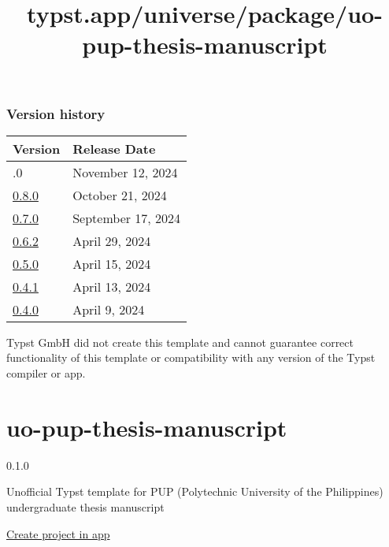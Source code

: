 \subsubsection{Version history}\label{version-history}

\begin{longtable}[]{@{}ll@{}}
\toprule\noalign{}
Version & Release Date \\
\midrule\noalign{}
\endhead
\bottomrule\noalign{}
\endlastfoot
0.9.0 & November 12, 2024 \\
\href{https://typst.app/universe/package/scholarly-tauthesis/0.8.0/}{0.8.0}
& October 21, 2024 \\
\href{https://typst.app/universe/package/scholarly-tauthesis/0.7.0/}{0.7.0}
& September 17, 2024 \\
\href{https://typst.app/universe/package/scholarly-tauthesis/0.6.2/}{0.6.2}
& April 29, 2024 \\
\href{https://typst.app/universe/package/scholarly-tauthesis/0.5.0/}{0.5.0}
& April 15, 2024 \\
\href{https://typst.app/universe/package/scholarly-tauthesis/0.4.1/}{0.4.1}
& April 13, 2024 \\
\href{https://typst.app/universe/package/scholarly-tauthesis/0.4.0/}{0.4.0}
& April 9, 2024 \\
\end{longtable}

Typst GmbH did not create this template and cannot guarantee correct
functionality of this template or compatibility with any version of the
Typst compiler or app.


\title{typst.app/universe/package/uo-pup-thesis-manuscript}

\label{banner}
\label{template-thumbnail}

\section{uo-pup-thesis-manuscript}\label{uo-pup-thesis-manuscript}

{ 0.1.0 }

Unofficial Typst template for PUP (Polytechnic University of the
Philippines) undergraduate thesis manuscript

\href{/app?template=uo-pup-thesis-manuscript&version=0.1.0}{Create
project in app}

